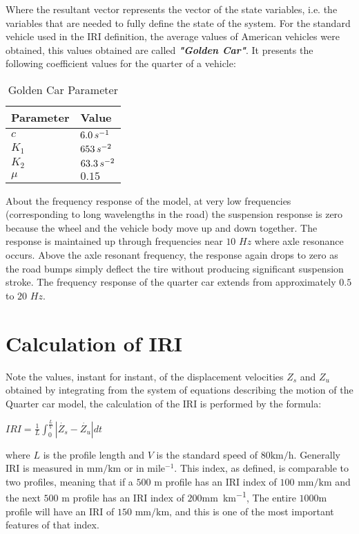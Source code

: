 \documentclass[tesi]{subfiles}
\begin{document}
Where the resultant vector represents the vector of the state variables, i.e. the variables that are needed to fully define the state of the system. 
For the standard vehicle used in the IRI definition, the average values of American vehicles were obtained, this values obtained are called \textbf{\textit{"Golden Car"}}\cite{little_book}.
It presents the following coefficient values for the quarter of a vehicle:


\begin{table}[ht]\label{table:Golden Car Parameter}
\centering
    \begin{tabular}{ | l | l |}

    \hline
    Parameter  & Value \\ \hline


    $c$ & $6.0 \thinspace s^{-1}$\\ \hline
    $K_{1}$ & $653 \thinspace s^{-2}$\\ \hline
    $K_{2}$ & $63.3 \thinspace s^{-2}$\\ \hline
    $\mu$ & $0.15$\\ \hline

\hline
    \end{tabular}
 \caption{Golden Car Parameter}
\end{table}


About the frequency response of the model, at very low frequencies (corresponding to long wavelengths in the road) the suspension response is zero because the wheel and the vehicle body move up and down together. The response is maintained up through frequencies near $10$ $Hz$ where axle resonance occurs. Above the axle resonant frequency, the response again drops to zero as the road bumps simply deflect the tire without producing significant suspension stroke.
The frequency response of the quarter car extends from approximately $0.5$ to $20$ $Hz$.

\section{Calculation of IRI}\label{sc:Calculation of IRI}
Note the values, instant for instant, of the displacement velocities $Z_{s}$  and $Z_{u}$ obtained by integrating from the system of equations describing the motion of the Quarter car model, the calculation of the IRI is performed by the formula:
\begin{center}
{\LARGE $IRI = \frac{1}{L} \int_{0}^{\frac{L}{V}} | \dot{Z_{s}} - \dot{Z_{u}} | dt$}
\end{center}
where $L$ is the profile length and $V$ is the standard speed of $\num{80} \si{\km\per\hour}$. Generally IRI is measured in $\si{\milli\meter\per\km}$ or in  mile$^{-1}$. This index, as defined, is comparable to two profiles, meaning that if a $500$ $\si{\meter}$ profile has an IRI index of $100$ $\si{\milli\meter\per\km}$ and the next $500$ \thinspace \si{\meter} profile has an IRI index of $200$\thinspace\si{\milli\meter\per\km}, The entire $1000$\si{\meter} profile will have an IRI of $150$ $\si{\milli\meter\per\km}$, and this is one of the most important features\cite{little_book} of that index. 
\end{document}
